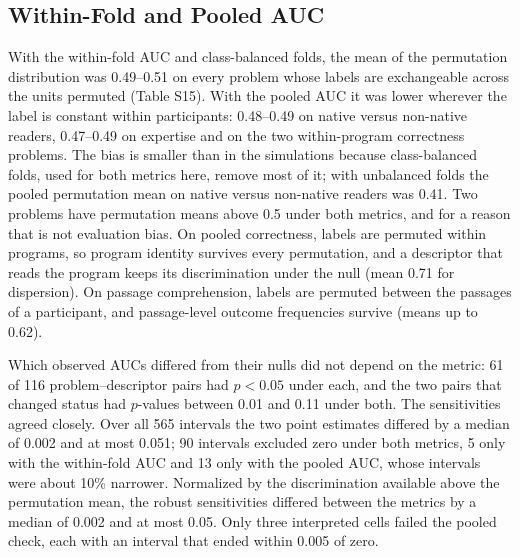 \begin{table}[!htbp]
\centering\small
\caption{Evidence ledger by problem. Intervals: genuine sensitivity intervals over all descriptors (exact invariances excluded). Excluding zero: in the primary analysis. Interpreted, robust: as defined in Section~\ref{sec:ledger}. Both learners: robust cells whose interval also excludes zero with the same sign under gradient-boosted trees.}
\label{tab:ledger}

\end{table}

\begin{table}[!htbp]
\centering\small
\caption{Robust cells: all those on SB-SAT and EMIP, and those on GazeBase that hold under both learners with a sensitivity of at least 0.10 in absolute value. AUC: observed within-fold AUC. Normalized: the sensitivity divided by the observed AUC minus the mean of its permutation distribution. Trees: the interval also excludes zero with the same sign under gradient-boosted trees.}
\label{tab:robust}
\resizebox{\linewidth}{!}{}
\end{table}

\subsection{Within-Fold and Pooled AUC}\label{sec:fold}
With the within-fold AUC and class-balanced folds, the mean of the permutation distribution was 0.49--0.51 on every problem whose labels are exchangeable across the units permuted (Table S15). With the pooled AUC it was lower wherever the label is constant within participants: 0.48--0.49 on native versus non-native readers, 0.47--0.49 on expertise and on the two within-program correctness problems. The bias is smaller than in the simulations because class-balanced folds, used for both metrics here, remove most of it; with unbalanced folds the pooled permutation mean on native versus non-native readers was 0.41. Two problems have permutation means above 0.5 under both metrics, and for a reason that is not evaluation bias. On pooled correctness, labels are permuted within programs, so program identity survives every permutation, and a descriptor that reads the program keeps its discrimination under the null (mean 0.71 for dispersion). On passage comprehension, labels are permuted between the passages of a participant, and passage-level outcome frequencies survive (means up to 0.62).

Which observed AUCs differed from their nulls did not depend on the metric: 61 of 116 problem--descriptor pairs had $p < 0.05$ under each, and the two pairs that changed status had $p$-values between 0.01 and 0.11 under both. The sensitivities agreed closely. Over all 565 intervals the two point estimates differed by a median of 0.002 and at most 0.051; 90 intervals excluded zero under both metrics, 5 only with the within-fold AUC and 13 only with the pooled AUC, whose intervals were about 10\% narrower. Normalized by the discrimination available above the permutation mean, the robust sensitivities differed between the metrics by a median of 0.002 and at most 0.05. Only three interpreted cells failed the pooled check, each with an interval that ended within 0.005 of zero.

